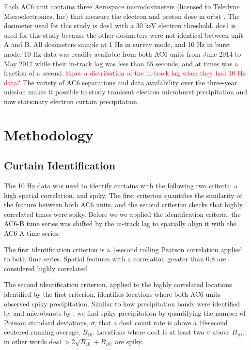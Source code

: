 \documentclass[draft]{agujournal2019}
\begin{document}
Each AC6 unit contains three Aerospace microdosimeters (licensed to Teledyne Microelectronics, Inc) that measure the electron and proton dose in orbit \cite{O'brien2016}. The dosimeter used for this study is dos1 with a $30$ keV electron threshold. dos1 is used for this study because the other dosimeters were not identical between unit A and B. All dosimeters sample at 1 Hz in survey mode, and 10 Hz in burst mode. 10 Hz data was readily available from both AC6 units from June 2014 to May 2017 while their in-track lag was less than 65 seconds, and at times was a fraction of a second. \textcolor{red}{Show a distribution of the in-track lag when they had 10 Hz data?} The variety of AC6 separations and data availability over the three-year mission makes it possible to study tranisent electron microburst precipitation \cite{Shumko2020} and now stationary electron curtain precipitation.

\section{Methodology} 
\subsection{Curtain Identification} \label{curtain_identification}
The 10 Hz data was used to identify curtains with the following two criteria: a high spatial correlation, and spiky. The first criterion quantifies the similarity of the feature between both AC6 units, and the second criterion checks that highly correlated times were spiky. Before we we applied the identification criteria, the AC6-B time series was shifted by the in-track lag to spatially align it with the AC6-A time series. 

The first identification criterion is a 1-second rolling Pearson correlation applied to both time series. Spatial features with a correlation greater than 0.8 are considered highly correlated.

The second identification criterion, applied to the highly correlated locations identified by the first criterion, identifies locations where both AC6 units observed spiky precipitation. Similar to how precipitation bands were identified by  and microbursts by , we find spiky precipitation by quantifying the number of Poisson standard deviations, $\sigma$, that a dos1 count rate is above a 10-second centered running average, $B_{10}$. Locations where dos1 is at least two $\sigma$ above $B_{10}$, in other words $dos1 > 2\sqrt{B_{10}} + B_{10}$, are spiky. 
\end{document}
